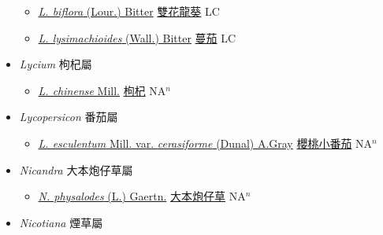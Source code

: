 \begin{itemize}
  \begin{itemize}
        \item[] \href{http://www.theplantlist.org/tpl1.1/search?q=Lycianthes+biflora}{\textit{L. biflora} (Lour.) Bitter}   \href{\detokenize{http://taibnet.sinica.edu.tw/chi/taibnet_species_list.php?T2=雙花龍葵&T2_new_value=true&fr=y}}{雙花龍葵} LC
        \item[] \href{http://www.theplantlist.org/tpl1.1/search?q=Lycianthes+lysimachioides}{\textit{L. lysimachioides} (Wall.) Bitter}   \href{\detokenize{http://taibnet.sinica.edu.tw/chi/taibnet_species_list.php?T2=蔓茄&T2_new_value=true&fr=y}}{蔓茄} LC
  \end{itemize}
 \item[] \textit{Lycium} 枸杞屬
                    
  \begin{itemize}
        \item[] \href{http://www.theplantlist.org/tpl1.1/search?q=Lycium+chinense}{\textit{L. chinense} Mill.}   \href{\detokenize{http://taibnet.sinica.edu.tw/chi/taibnet_species_list.php?T2=枸杞&T2_new_value=true&fr=y}}{枸杞} NA$^n$
  \end{itemize}
 \item[] \textit{Lycopersicon} 番茄屬
                    
  \begin{itemize}
        \item[] \href{http://www.theplantlist.org/tpl1.1/search?q=Lycopersicon+esculentum+var.+cerasiforme}{\textit{L. esculentum} Mill. var. \textit{cerasiforme} (Dunal) A.Gray}   \href{\detokenize{http://taibnet.sinica.edu.tw/chi/taibnet_species_list.php?T2=櫻桃小番茄&T2_new_value=true&fr=y}}{櫻桃小番茄} NA$^n$
  \end{itemize}
 \item[] \textit{Nicandra} 大本炮仔草屬
                    
  \begin{itemize}
        \item[] \href{http://www.theplantlist.org/tpl1.1/search?q=Nicandra+physalodes}{\textit{N. physalodes} (L.) Gaertn.}   \href{\detokenize{http://taibnet.sinica.edu.tw/chi/taibnet_species_list.php?T2=大本炮仔草&T2_new_value=true&fr=y}}{大本炮仔草} NA$^n$
  \end{itemize}
 \item[] \textit{Nicotiana} 煙草屬
                    

\end{itemize}

